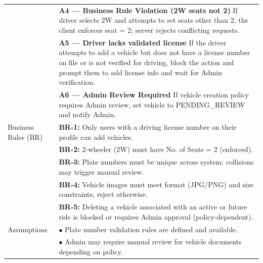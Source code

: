 \begin{longtable}{|>{\raggedright\arraybackslash}p{4cm}|>{\raggedright\arraybackslash}p{11cm}|}
& \textbf{A4 --- Business Rule Violation (2W seats not 2)} \newline If driver selects 2W and attempts to set seats other than 2, the client enforces seat = 2; server rejects conflicting requests. \\
& \textbf{A5 --- Driver lacks validated license} \newline If the driver attempts to add a vehicle but does not have a license number on file or is not verified for driving, block the action and prompt them to add license info and wait for Admin verification. \\
& \textbf{A6 --- Admin Review Required} \newline If vehicle creation policy requires Admin review, set vehicle to PENDING\_REVIEW and notify Admin. \\
\hline
Business Rules (BR) & \textbf{BR-1:} Only users with a driving license number on their profile can add vehicles. \\
& \textbf{BR-2:} 2-wheeler (2W) must have No. of Seats = 2 (enforced). \\
& \textbf{BR-3:} Plate numbers must be unique across system; collisions may trigger manual review. \\
& \textbf{BR-4:} Vehicle images must meet format (JPG/PNG) and size constraints; reject otherwise. \\
& \textbf{BR-5:} Deleting a vehicle associated with an active or future ride is blocked or requires Admin approval (policy-dependent). \\
\hline
Assumptions & $\bullet$ Plate number validation rules are defined and available. \\
& $\bullet$ Admin may require manual review for vehicle documents depending on policy. \\
\end{longtable}

